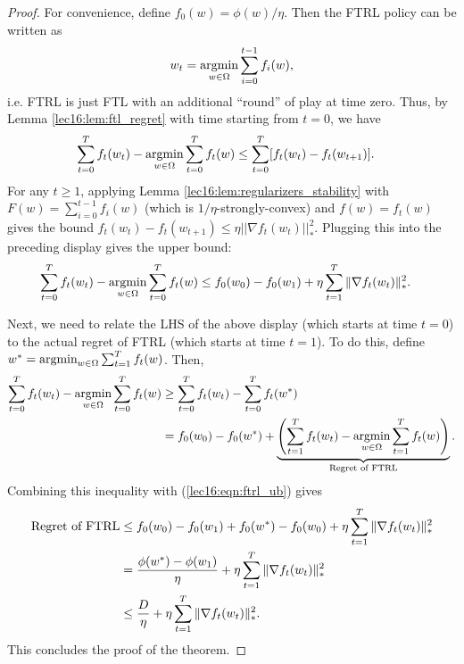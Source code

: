 \begin{proof}
For convenience, define $f_0(w) = \phi(w) / \eta$.  Then the FTRL policy can be written as
\begin{equation}
w_t = \operatorname*{\textup{argmin}}_{w \in \Omega} \sum_{i = 0}^{t - 1} f_i(w),
\end{equation}
i.e. FTRL is just FTL with an additional ``round'' of play at time zero. Thus, by Lemma \ref{lec16:lem:ftl_regret} with time starting from $t = 0$, we have
\begin{align}
\sum_{t = 0}^T f_t(w_t) - \operatorname*{\textup{argmin}}_{w \in \Omega} \sum_{t = 0}^T f_t(w) &\leq \sum_{t = 0}^T [f_t(w_t) - f_t(w_{t+1})].
\end{align}
For any $t \geq 1$, applying Lemma \ref{lec16:lem:regularizers_stability} with $F(w) = \sum_{i = 0}^{t-1} f_i(w)$ (which is $1/\eta$-strongly-convex) and $f(w) = f_t(w)$ gives the bound $f_t(w_t) - f_t(w_{t+1}) \leq \eta || \nabla f_t(w_t) ||_*^2$.  Plugging this into the preceding display gives the upper bound:
\begin{align}
\sum_{t = 0}^T f_t(w_t) - \operatorname*{\textup{argmin}}_{w \in \Omega} \sum_{t = 0}^T f_t(w) &\leq f_0(w_0) - f_0(w_1) + \eta \sum_{t = 1}^T \|\nabla f_t(w_t)\|_*^2. \label{lec16:eqn:ftrl_ub}
\end{align}

Next, we need to relate the LHS of the above display (which starts at time $t = 0$) to the actual regret of FTRL (which starts at time $t = 1$). To do this, define $w^* = \operatorname*{\textup{argmin}}_{w \in \Omega} \sum_{t = 1}^T f_t(w)$. Then,
\begin{align}
\sum_{t = 0}^T f_t(w_t) - \operatorname*{\textup{argmin}}_{w \in \Omega} \sum_{t = 0}^T f_t(w) &\geq \sum_{t = 0}^T f_t(w_t) - \sum_{t = 0}^T f_t(w^*)\\
&= f_0(w_0) - f_0(w^*) + \underbrace{\left( \sum_{t = 1}^T f_t(w_t) - \operatorname*{\textup{argmin}}_{w \in \Omega} \sum_{t = 1}^T f_t(w)  \right)}_{\text{Regret of FTRL}}.
\end{align}
Combining this inequality with (\ref{lec16:eqn:ftrl_ub}) gives
\begin{align}
\text{Regret of FTRL} &\leq f_0(w_0) - f_0(w_1) + f_0(w^*) - f_0(w_0) + \eta \sum_{t = 1}^T \|\nabla f_t(w_t)\|_*^2\\
&= \frac{\phi(w^*) - \phi(w_1)}{\eta} + \eta \sum_{t = 1}^T \|\nabla f_t(w_t)\|_*^2\\
&\leq \frac{D}{\eta} + \eta \sum_{t = 1}^T \|\nabla f_t(w_t)\|_*^2.
\end{align}
This concludes the proof of the theorem.
\end{proof}

